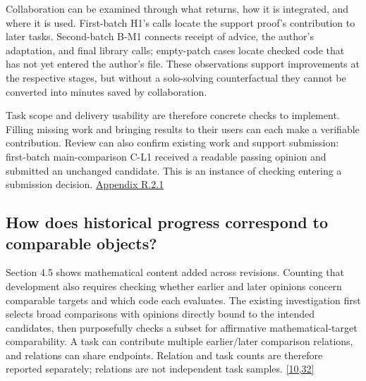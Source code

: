 Collaboration can be examined through what returns, how it is integrated, and where it is used. First-batch H1's calls locate the support proof's contribution to later tasks. Second-batch B-M1 connects receipt of advice, the author's adaptation, and final library calls; empty-patch cases locate checked code that has not yet entered the author's file. These observations support improvements at the respective stages, but without a solo-solving counterfactual they cannot be converted into minutes saved by collaboration.

Task scope and delivery usability are therefore concrete checks to implement. Filling missing work and bringing results to their users can each make a verifiable contribution. Review can also confirm existing work and support submission: first-batch main-comparison C-L1 received a readable passing opinion and submitted an unchanged candidate. This is an instance of checking entering a submission decision. \href{en-appendix.pdf\#r2-1}{Appendix R.2.1}

\subsection[How does historical progress correspond to comparable objects?]{\texorpdfstring{\protect\hypertarget{section-6-3}{}How does historical progress correspond to comparable objects?}{How does historical progress correspond to comparable objects?}}
Section 4.5 shows mathematical content added across revisions. Counting that development also requires checking whether earlier and later opinions concern comparable targets and which code each evaluates. The existing investigation first selects broad comparisons with opinions directly bound to the intended candidates, then purposefully checks a subset for affirmative mathematical-target comparability. A task can contribute multiple earlier/later comparison relations, and relations can share endpoints. Relation and task counts are therefore reported separately; relations are not independent task samples. \hyperlink{ref-10}{\mbox{[10,32]}}

